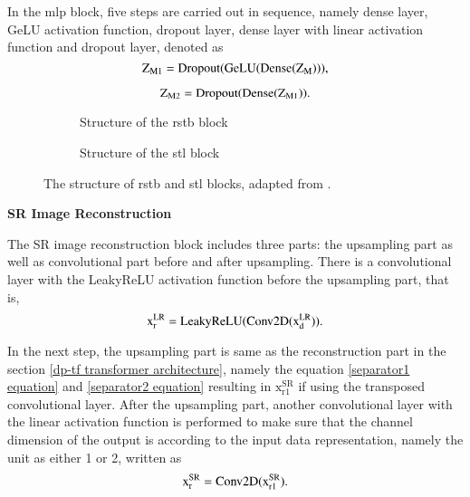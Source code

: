 In the \gls{mlp} block, five steps are carried out in sequence, namely dense layer, GeLU activation function, dropout layer, dense layer with linear activation function and dropout layer, denoted as
\begin{equation}
    \centering
    \mathrm{Z_{M1} = Dropout(GeLU(Dense(Z_{M})))},
    \label{mlp equation1}
\end{equation}

\begin{equation}
    \centering
    \mathrm{Z_{M2} = Dropout(Dense(Z_{M1}))}.
\end{equation}

\begin{figure}
    \centering
    \hspace{-0.4cm}
    \begin{subfigure}{0.49\textwidth}
        \centering
        \caption{Structure of the \gls{rstb} block}
        \label{rstb_block}
    \end{subfigure}
    \begin{subfigure}{0.49\textwidth}
        \centering
        \caption{Structure of the \gls{stl} block}
        \label{stl_block}
    \end{subfigure}
    \caption{The structure of \gls{rstb} and \gls{stl} blocks, adapted from \cite{liang_swinir_2021}.}
	\label{structure of the rstb and stl blocks}
\end{figure}

\begin{spacing}{1.5}
\textbf{\large{SR Image Reconstruction}}
\end{spacing}

The SR image reconstruction block includes three parts: the upsampling part as well as convolutional part before and after upsampling. There is a convolutional layer with the LeakyReLU activation function before the upsampling part, that is,
\begin{equation}
    \centering
    \mathrm{x^{LR}_{r} = LeakyReLU(Conv2D(x^{LR}_{d}))}.
\end{equation}

In the next step, the upsampling part is same as the reconstruction part in the section \ref{dp-tf transformer architecture}, namely the equation \ref{separator1 equation} and \ref{separator2 equation} resulting in $\mathrm{x^{SR}_{r1}}$ if using the transposed convolutional layer. After the upsampling part, another convolutional layer with the linear activation function is performed to make sure that the channel dimension of the output is according to the input data representation, namely the unit as either 1 or 2, written as
\begin{equation}
    \centering
    \mathrm{x^{SR}_r = Conv2D(x^{SR}_{r1})}.
\end{equation}

